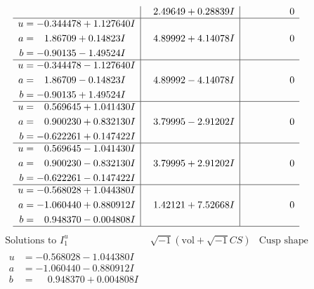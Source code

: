 \documentclass[1p]{elsarticle_modified}
\theoremstyle{definition}
\newcommand{\I}{\sqrt{-1}}
\begin{document}
$$\begin{array}{c|c|c}
 & \phantom{-}2.49649 + 0.28839 I & \phantom{-0.000000 } 0 \\ \hline\begin{aligned}
u &= -0.344478 + 1.127640 I \\
a &= \phantom{-}1.86709 + 0.14823 I \\
b &= -0.90135 - 1.49524 I\end{aligned}
 & \phantom{-}4.89992 + 4.14078 I & \phantom{-0.000000 } 0 \\ \hline\begin{aligned}
u &= -0.344478 - 1.127640 I \\
a &= \phantom{-}1.86709 - 0.14823 I \\
b &= -0.90135 + 1.49524 I\end{aligned}
 & \phantom{-}4.89992 - 4.14078 I & \phantom{-0.000000 } 0 \\ \hline\begin{aligned}
u &= \phantom{-}0.569645 + 1.041430 I \\
a &= \phantom{-}0.900230 + 0.832130 I \\
b &= -0.622261 + 0.147422 I\end{aligned}
 & \phantom{-}3.79995 - 2.91202 I & \phantom{-0.000000 } 0 \\ \hline\begin{aligned}
u &= \phantom{-}0.569645 - 1.041430 I \\
a &= \phantom{-}0.900230 - 0.832130 I \\
b &= -0.622261 - 0.147422 I\end{aligned}
 & \phantom{-}3.79995 + 2.91202 I & \phantom{-0.000000 } 0 \\ \hline\begin{aligned}
u &= -0.568028 + 1.044380 I \\
a &= -1.060440 + 0.880912 I \\
b &= \phantom{-}0.948370 - 0.004808 I\end{aligned}
 & \phantom{-}1.42121 + 7.52668 I & \phantom{-0.000000 } 0\\
 \hline 
 \end{array}$$\newpage$$\begin{array}{c|c|c}  
\text{Solutions to }I^u_{1}& \I (\text{vol} + \sqrt{-1}CS) & \text{Cusp shape}\\
 \hline 
\begin{aligned}
u &= -0.568028 - 1.044380 I \\
a &= -1.060440 - 0.880912 I \\
b &= \phantom{-}0.948370 + 0.004808 I\end{aligned}

\end{array}$$
\end{document}
